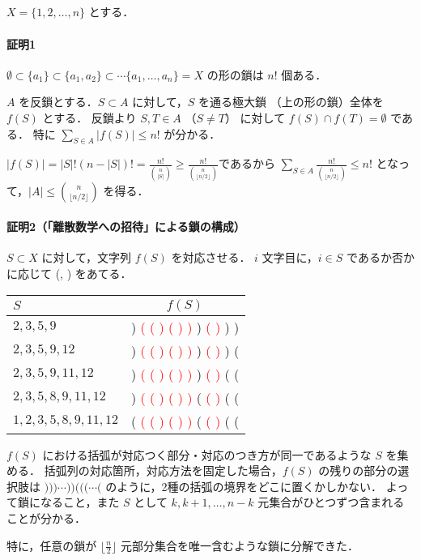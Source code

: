 \subsection{}
$X = \{1,2,\ldots,n\}$ とする．

\paragraph*{証明1}
$\emptyset\subset \{a_1\}\subset \{a_1,a_2\}\subset \cdots \{a_1,\ldots, a_n\} = X$ の形の鎖は $n!$ 個ある．

$A$ を反鎖とする．$S\subset A$ に対して，$S$ を通る極大鎖 （上の形の鎖）全体を $f(S)$ とする．
反鎖より $S, T\in A$ （$S\neq T$） に対して $f(S) \cap f(T) = \emptyset$ である．
特に $\sum_{S\in A}|f(S)| \leq n!$ が分かる．

$|f(S)| = |S|!(n-|S|)! = \frac{n!}{\binom{n}{|S|}} \geq \frac{n!}{\binom{n}{\lfloor n/2\rfloor}}$であるから
$\sum_{S\in A}\frac{n!}{\binom{n}{\lfloor n/2\rfloor}} \leq n!$ となって，$|A|\leq \binom{n}{\lfloor n/2\rfloor}$ を得る．


\paragraph*{証明2（「離散数学への招待」による鎖の構成）}
$S\subset X$ に対して，文字列 $f(S)$ を対応させる．
$i$ 文字目に，$i\in S$ であるか否かに応じて (, ) をあてる．

\begin{tabular}{|l|c|}
\hline
$S$ & $f(S)$ \\\hline
$2,3,5,9$ & ) \textcolor{red}{( ( ) ( ) )} ) \textcolor{red}{( )} ) )\\\hline
$2,3,5,9,12$ &  ) \textcolor{red}{( ( ) ( ) )} ) \textcolor{red}{( )} ) (\\\hline
$2,3,5,9,11,12$ &  ) \textcolor{red}{( ( ) ( ) )} ) \textcolor{red}{( )} ( (\\\hline
$2,3,5,8,9,11,12$ &  ) \textcolor{red}{( ( ) ( ) )} ( \textcolor{red}{( )} ( (\\\hline
$1,2,3,5,8,9,11,12$ &  ( \textcolor{red}{( ( ) ( ) )} ( \textcolor{red}{( )} ( (\\\hline
\end{tabular}

$f(S)$ における括弧が対応つく部分・対応のつき方が同一であるような $S$ を集める．
括弧列の対応箇所，対応方法を固定した場合，$f(S)$ の残りの部分の選択肢は $)))\cdots ))(((\cdots ($ のように，2種の括弧の境界をどこに置くかしかない．
よって鎖になること，また $S$ として $k, k+1, \ldots, n-k$ 元集合がひとつずつ含まれることが分かる．

特に，任意の鎖が $\lfloor \frac{n}{2}\rfloor$ 元部分集合を唯一含むような鎖に分解できた．